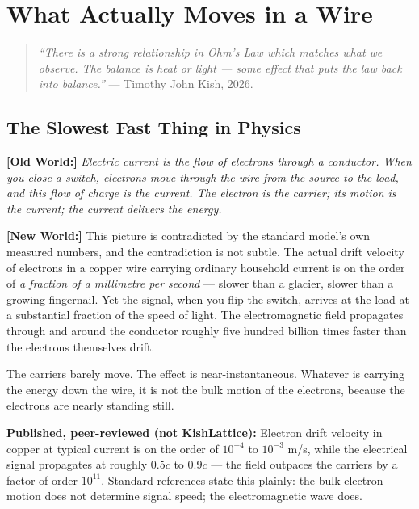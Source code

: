 \documentclass[11pt, letterpaper, openany]{book}
\newcommand{\oldworld}[1]{\noindent\textbf{\color{goldseal}[Old World:]}
  \textit{#1}\medskip}
\newcommand{\newworldcmd}[1]{\noindent\textbf{\color{kishblue}[New World:]}
  #1\medskip}
\begin{document}
\chapter{What Actually Moves in a Wire}
 
\begin{quote}
\textit{``There is a strong relationship in Ohm's Law which matches what we
observe. The balance is heat or light --- some effect that puts the law
back into balance.''} --- Timothy John Kish, 2026.
\end{quote}
 
\section{The Slowest Fast Thing in Physics}
 
\oldworld{Electric current is the flow of electrons through a conductor.
When you close a switch, electrons move through the wire from the source
to the load, and this flow of charge is the current. The electron is the
carrier; its motion is the current; the current delivers the energy.}
 
\newworldcmd{This picture is contradicted by the standard model's own
measured numbers, and the contradiction is not subtle. The actual drift
velocity of electrons in a copper wire carrying ordinary household current
is on the order of \emph{a fraction of a millimetre per second} --- slower
than a glacier, slower than a growing fingernail. Yet the signal, when you
flip the switch, arrives at the load at a substantial fraction of the speed
of light. The electromagnetic field propagates through and around the
conductor roughly five hundred billion times faster than the electrons
themselves drift.
 
The carriers barely move. The effect is near-instantaneous. Whatever is
carrying the energy down the wire, it is not the bulk motion of the
electrons, because the electrons are nearly standing still.}
 
\begin{empiricalbox}
\textbf{Published, peer-reviewed (not KishLattice):}
Electron drift velocity in copper at typical current is on the order of
$10^{-4}$ to $10^{-3}$ m/s, while the electrical signal propagates at
roughly $0.5c$ to $0.9c$ --- the field outpaces the carriers by a factor
of order $10^{11}$. Standard references state this plainly: the bulk
electron motion does not determine signal speed; the electromagnetic wave
does.
\end{empiricalbox}
 
\end{document}
